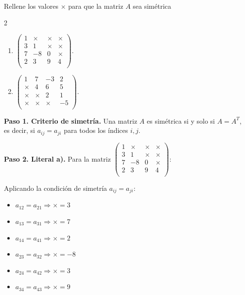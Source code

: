 \begin{prob} 
Rellene los valores $\times$ para que la matriz $A$ sea simétrica

\begin{multicols}{2}
\begin{enumerate}[$a)$]
\item $\left( \begin{array}{cccc}
1&\times &\times &\times \\
3&1&\times &\times \\
7&-8&0&\times \\
2&3&9&4 \\
\end{array} \right).$

\item $\left( \begin{array}{cccc}
1&7 &-3 &2 \\
\times &4& 6 & 5 \\
\times &\times &2& 1 \\
\times &\times &\times &-5 \\
\end{array} \right).$
\end{enumerate}
\end{multicols}

\begin{myproof}
\textbf{Paso 1. Criterio de simetría.} Una matriz $A$ es simétrica si y solo si $A = A^T$, es decir, si $a_{ij} = a_{ji}$ para todos los índices $i, j$.

\textbf{Paso 2. Literal a).} Para la matriz $\left( \begin{array}{cccc}
1&\times &\times &\times \\
3&1&\times &\times \\
7&-8&0&\times \\
2&3&9&4 \\
\end{array} \right)$:

Aplicando la condición de simetría $a_{ij} = a_{ji}$:
\begin{itemize}
\item $a_{12} = a_{21} \Rightarrow \times = 3$
\item $a_{13} = a_{31} \Rightarrow \times = 7$
\item $a_{14} = a_{41} \Rightarrow \times = 2$
\item $a_{23} = a_{32} \Rightarrow \times = -8$
\item $a_{24} = a_{42} \Rightarrow \times = 3$
\item $a_{34} = a_{43} \Rightarrow \times = 9$
\end{itemize}


\end{myproof}
\end{prob}
